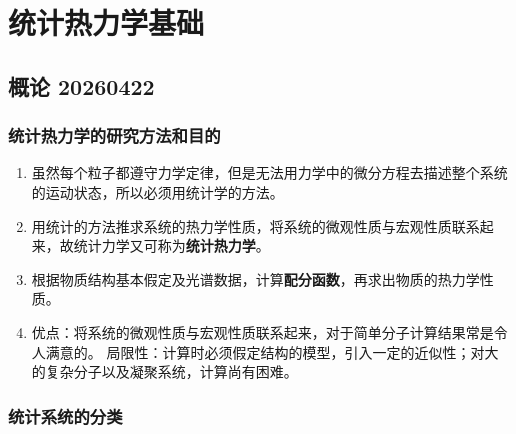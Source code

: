 \section{统计热力学基础}

\subsection{概论 20260422}

\subsubsection{统计热力学的研究方法和目的}

\begin{enumerate}
    \item 虽然每个粒子都遵守力学定律，但是无法用力学中的微分方程去描述整个系统的运动状态，所以必须用统计学的方法。
    \item 用统计的方法推求系统的热力学性质，将系统的微观性质与宏观性质联系起来，故统计力学又可称为\textbf{统计热力学}。
    \item 根据物质结构基本假定及光谱数据，计算\textbf{配分函数}，再求出物质的热力学性质。
    \item 优点：将系统的微观性质与宏观性质联系起来，对于简单分子计算结果常是令人满意的。
    局限性：计算时必须假定结构的模型，引入一定的近似性；对大的复杂分子以及凝聚系统，计算尚有困难。
\end{enumerate}

\subsubsection{统计系统的分类}

